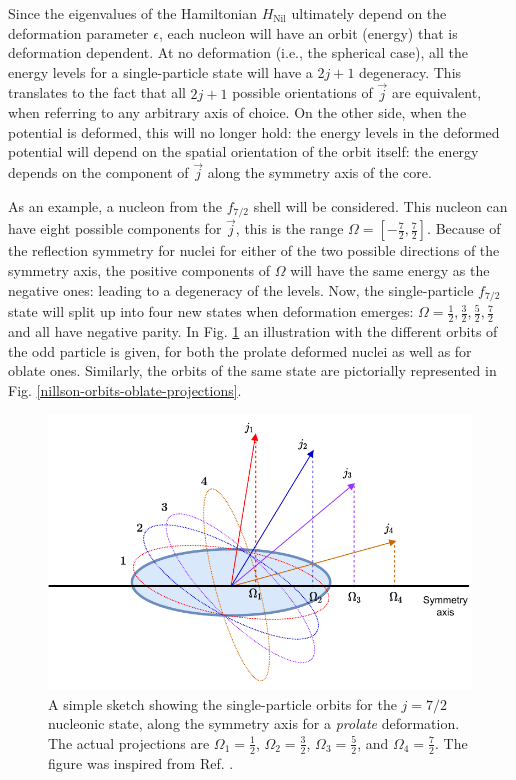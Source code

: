 Since the eigenvalues of the Hamiltonian $H_\text{Nil}$ ultimately depend on the deformation parameter $\epsilon$, each nucleon will have an orbit (energy) that is deformation dependent. At no deformation (i.e., the spherical case), all the energy levels for a single-particle state will have a $2j+1$ degeneracy. This translates to the fact that all $2j+1$ possible orientations of $\vec{j}$ are equivalent, when referring to any arbitrary axis of choice. On the other side, when the potential is deformed, this will no longer hold: the energy levels in the deformed potential will depend on the spatial orientation of the orbit itself: the energy depends on the component of $\vec{j}$ along the symmetry axis of the core.

As an example, a nucleon from the $f_{7/2}$ shell will be considered. This nucleon can have eight possible components for $\vec{j}$, this is the range $\Omega=[-\frac{7}{2},\frac{7}{2}]$. Because of the reflection symmetry for nuclei for either of the two possible directions of the symmetry axis, the positive components of $\Omega$ will have the same energy as the negative ones: leading to a degeneracy of the levels. Now, the single-particle $f_{7/2}$ state will split up into four new states when deformation emerges: $\Omega=\frac{1}{2},\frac{3}{2},\frac{5}{2},\frac{7}{2}$ and all have negative parity. In Fig. \ref{nillson-orbits-prolate-projections} an illustration with the different orbits of the odd particle is given, for both the prolate deformed nuclei as well as for oblate ones. Similarly, the orbits of the same state are pictorially represented in Fig. \ref{nillson-orbits-oblate-projections}.

\begin{figure}
    \centering
    \includegraphics[scale=1]{Chapters/Figures/nillson_SP_orbits.pdf}
    \caption{A simple sketch showing the single-particle orbits for the $j=7/2$ nucleonic state, along the symmetry axis for a \emph{prolate} deformation. The actual projections are $\Omega_1=\frac{1}{2}$, $\Omega_2=\frac{3}{2}$, $\Omega_3=\frac{5}{2}$, and $\Omega_4=\frac{7}{2}$. The figure was inspired from Ref. \cite{krane1991introductory}.}
    \label{nillson-orbits-prolate-projections}
\end{figure}

